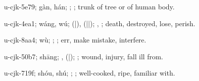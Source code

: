 \begin{multicols}{2}
{\cjkgGlue{}u-cjk-5e79; gàn, hán; \cjkgGlue{}; \cjkgGlue{}; trunk of tree or of human body.

\cjkgGlue{}u-cjk-4ea1; wáng, wú; \cjkgGlue{}\cjkgGlue{}(\cjkgGlue{}|\cjkgGlue{}), \cjkgGlue{}\cjkgGlue{}(\cjkgGlue{}|\cjkgGlue{}|\cjkgGlue{}); \cjkgGlue{}, \cjkgGlue{}; death, destroyed, lose, perish.

\cjkgGlue{}u-cjk-8aa4; wù; \cjkgGlue{}\cjkgGlue{}\cjkgGlue{}; \cjkgGlue{}; err, make mistake, interfere.

\cjkgGlue{}u-cjk-50b7; shāng; \cjkgGlue{}, \cjkgGlue{}\cjkgGlue{}(\cjkgGlue{}|\cjkgGlue{}); \cjkgGlue{}; wound, injury, fall ill from.

\cjkgGlue{}u-cjk-719f; shóu, shú; \cjkgGlue{}\cjkgGlue{}\cjkgGlue{}; \cjkgGlue{}; well-cooked, ripe, familiar with.

}
\end{multicols}
